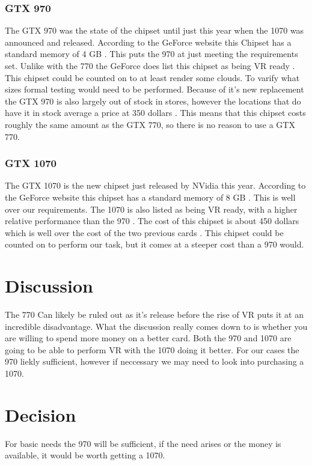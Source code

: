 \documentclass{article}
\begin{document}
\subsubsection{GTX 970}
The GTX 970 was the state of the chipset until just this year when the 1070 was announced and released.
According to the GeForce website this Chipset has a standard memory of 4 GB \cite{geforce}.
This puts the 970 at just meeting the requirements set.
Unlike with the 770 the GeForce does list this chipset as being VR ready \cite{geforce}.
This chipset could be counted on to at least render some clouds.
To varify what sizes formal testing would need to be performed.
Because of it's new replacement the GTX 970 is also largely out of stock in stores, however the locations that do have it in stock average a price at 350 dollars \cite{geforce}.
This means that this chipset costs roughly the same amount as the GTX 770, so there is no reason to use a GTX 770.

\subsubsection{GTX 1070}
The GTX 1070 is the new chipset just released by NVidia this year.
According to the GeForce website this chipset has a standard memory of 8 GB \cite{geforce}.
This is well over our requirements.
The 1070 is also listed as being VR ready, with a higher relative performance than the 970 \cite{geforce}.
The cost of this chipset is about 450 dollars which is well over the cost of the two previous cards \cite{geforce}.
This chipset could be counted on to perform our task, but it comes at a steeper cost than a 970 would.

\section{Discussion}
The 770 Can likely be ruled out as it's release before the rise of VR puts it at an incredible disadvantage.
What the discussion really comes down to is whether you are willing to spend more money on a better card.
Both the 970 and 1070 are going to be able to perform VR with the 1070 doing it better.
For our cases the 970 liekly sufficient, however if neccessary we may need to look into purchasing a 1070.

\section{Decision}
For basic needs the 970 will be sufficient, if the need arises or the money is available, it would be worth getting a 1070.
\end{document}
